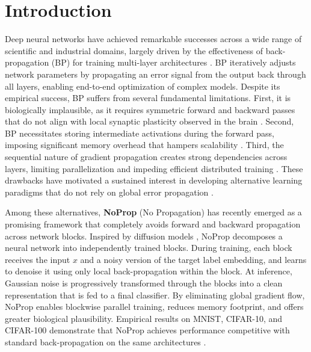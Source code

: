 \documentclass[preprint,12pt]{elsarticle}
\begin{document}
\section{Introduction}

Deep neural networks have achieved remarkable successes across a wide range of scientific and industrial domains, largely driven by the effectiveness of back-propagation (BP) for training multi-layer architectures \cite{rumelhart1986learning}. BP iteratively adjusts network parameters by propagating an error signal from the output back through all layers, enabling end-to-end optimization of complex models. Despite its empirical success, BP suffers from several fundamental limitations. First, it is biologically implausible, as it requires symmetric forward and backward passes that do not align with local synaptic plasticity observed in the brain \cite{grossberg1987competitive,lillicrap2016random}. Second, BP necessitates storing intermediate activations during the forward pass, imposing significant memory overhead that hampers scalability \cite{rumelhart1986learning}. Third, the sequential nature of gradient propagation creates strong dependencies across layers, limiting parallelization and impeding efficient distributed training \cite{carreira2014distributed}. These drawbacks have motivated a sustained interest in developing alternative learning paradigms that do not rely on global error propagation \cite{hinton2006fast,lee2015difference,nokland2016direct,jaderberg2017decoupled,hinton2022forward}.

Among these alternatives, \textbf{NoProp} (No Propagation) \cite{li2025noprop} has recently emerged as a promising framework that completely avoids forward and backward propagation across network blocks. Inspired by diffusion models \cite{sohl2015deep,ho2020denoising,song2021maximum}, NoProp decomposes a neural network into independently trained blocks. During training, each block receives the input $x$ and a noisy version of the target label embedding, and learns to denoise it using only local back-propagation within the block. At inference, Gaussian noise is progressively transformed through the blocks into a clean representation that is fed to a final classifier. By eliminating global gradient flow, NoProp enables blockwise parallel training, reduces memory footprint, and offers greater biological plausibility. Empirical results on MNIST, CIFAR-10, and CIFAR-100 demonstrate that NoProp achieves performance competitive with standard back-propagation on the same architectures \cite{li2025noprop}.
\end{document}
